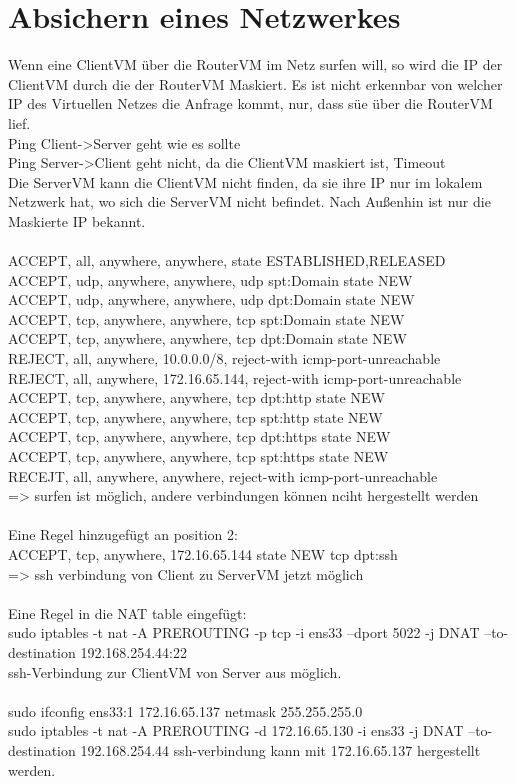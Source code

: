 \documentclass[12pt]{article}
\theoremstyle{plain}
\begin{document}
\section{Absichern eines Netzwerkes}
Wenn eine ClientVM über die RouterVM im Netz surfen will, so wird die IP der ClientVM durch die der RouterVM Maskiert. Es ist nicht erkennbar von welcher IP des Virtuellen Netzes die Anfrage kommt, nur, dass süe über die RouterVM lief.\\
Ping Client->Server geht wie es sollte\\
Ping Server->Client geht nicht, da die ClientVM maskiert ist, Timeout\\
Die ServerVM kann die ClientVM nicht finden, da sie ihre IP nur im lokalem Netzwerk hat, wo sich die ServerVM nicht befindet. Nach Außenhin ist nur die Maskierte IP bekannt.\\
\\
ACCEPT, all, anywhere, anywhere, state ESTABLISHED,RELEASED
ACCEPT, udp, anywhere, anywhere, udp spt:Domain state NEW\\
ACCEPT, udp, anywhere, anywhere, udp dpt:Domain state NEW\\
ACCEPT, tcp, anywhere, anywhere, tcp spt:Domain state NEW\\
ACCEPT, tcp, anywhere, anywhere, tcp dpt:Domain state NEW\\
REJECT, all, anywhere, 10.0.0.0/8, reject-with icmp-port-unreachable\\
REJECT, all, anywhere, 172.16.65.144, reject-with icmp-port-unreachable\\
ACCEPT, tcp, anywhere, anywhere, tcp dpt:http state NEW\\
ACCEPT, tcp, anywhere, anywhere, tcp spt:http state NEW\\
ACCEPT, tcp, anywhere, anywhere, tcp dpt:https state NEW\\
ACCEPT, tcp, anywhere, anywhere, tcp spt:https state NEW\\
RECEJT, all, anywhere, anywhere, reject-with icmp-port-unreachable\\
=> surfen ist möglich, andere verbindungen können nciht hergestellt werden\\
\\
Eine Regel hinzugefügt an position 2:\\
ACCEPT, tcp, anywhere, 172.16.65.144 state NEW tcp dpt:ssh\\
=> ssh verbindung von Client zu ServerVM jetzt möglich\\
\\
Eine Regel in die NAT table eingefügt:\\
sudo iptables -t nat -A PREROUTING -p tcp -i ens33 --dport 5022 -j DNAT --to-destination 192.168.254.44:22\\
ssh-Verbindung zur ClientVM von Server aus möglich.\\
\\
sudo ifconfig ens33:1 172.16.65.137 netmask 255.255.255.0\\
sudo iptables -t nat -A PREROUTING -d 172.16.65.130 -i ens33 -j DNAT --to-destination 192.168.254.44
ssh-verbindung kann mit 172.16.65.137 hergestellt werden.\\
\\
\end{document}
